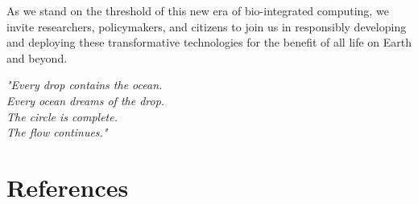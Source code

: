 \documentclass[11pt,a4paper]{article}
\begin{document}
As we stand on the threshold of this new era of bio-integrated computing, we invite researchers, policymakers, and citizens to join us in responsibly developing and deploying these transformative technologies for the benefit of all life on Earth and beyond.

\vspace{1cm}

\begin{center}
\textit{"Every drop contains the ocean.\\
Every ocean dreams of the drop.\\
The circle is complete.\\
The flow continues."}
\end{center}

\newpage

\section{References}
\end{document}
